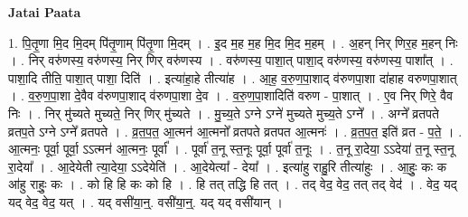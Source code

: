 \documentclass[17pt]{extarticle}
\begin{document}
\textbf{Jatai Paata} \newline

1. पि॒तृ॒णा मि॒द मि॒दम् पि॑तृ॒णाम् पि॑तृ॒णा मि॒दम् । . इ॒द म॒ह म॒ह मि॒द मि॒द म॒हम् । . अ॒हन् निर् णिर॒ह म॒हन् निः । . निर् वरु॑णस्य॒ वरु॑णस्य॒ निर् णिर् वरु॑णस्य । . वरु॑णस्य॒ पाशा॒त् पाशा॒द् वरु॑णस्य॒ वरु॑णस्य॒ पाशा᳚त् । . पाशा॒दि तीति॒ पाशा॒त् पाशा॒ दिति॑ । . इत्या॑हा॒हे तीत्या॑ह । . आ॒ह॒ व॒रु॒ण॒पा॒शाद् व॑रुणपा॒शा दा॑हाह वरुणपा॒शात् । . व॒रु॒ण॒पा॒शा दे॒वैव व॑रुणपा॒शाद् व॑रुणपा॒शा दे॒व । . व॒रु॒ण॒पा॒शादिति॑ वरुण - पा॒शात् । . ए॒व निर् णिरे॒ वैव निः । . निर् मु॑च्यते मुच्यते॒ निर् णिर् मु॑च्यते । . मु॒च्य॒ते ऽग्ने ऽग्ने॑ मुच्यते मुच्य॒ते ऽग्ने᳚ । . अग्ने᳚ व्रतपते व्रतप॒ते ऽग्ने ऽग्ने᳚ व्रतपते । . व्र॒त॒प॒त॒ आ॒त्मन॑ आ॒त्मनो᳚ व्रतपते व्रतपत आ॒त्मनः॑ । . व्र॒त॒प॒त॒ इति॑ व्रत - प॒ते॒ । . आ॒त्मनः॒ पूर्वा॒ पूर्वा॒ ऽऽत्मन॑ आ॒त्मनः॒ पूर्वा᳚ । . पूर्वा॑ त॒नू स्त॒नूः पूर्वा॒ पूर्वा॑ त॒नूः । . त॒नू रा॒देया॒ ऽऽदेया॑ त॒नू स्त॒नू रा॒देया᳚ । . आ॒देयेती त्या॒देया॒ ऽऽदेयेति॑ । . आ॒देयेत्या᳚ - देया᳚ । . इत्या॑हु राहु॒रि तीत्या॑हुः । . आ॒हुः॒ कः क आ॑हु राहुः॒ कः । . को हि हि कः को हि । . हि तत् तद्धि हि तत् । . तद् वेद॒ वेद॒ तत् तद् वेद॑ । . वेद॒ यद् यद् वेद॒ वेद॒ यत् । . यद् वसी॑या॒न्॒. वसी॑या॒न्॒. यद् यद् वसी॑यान् । \newline
\end{document}
